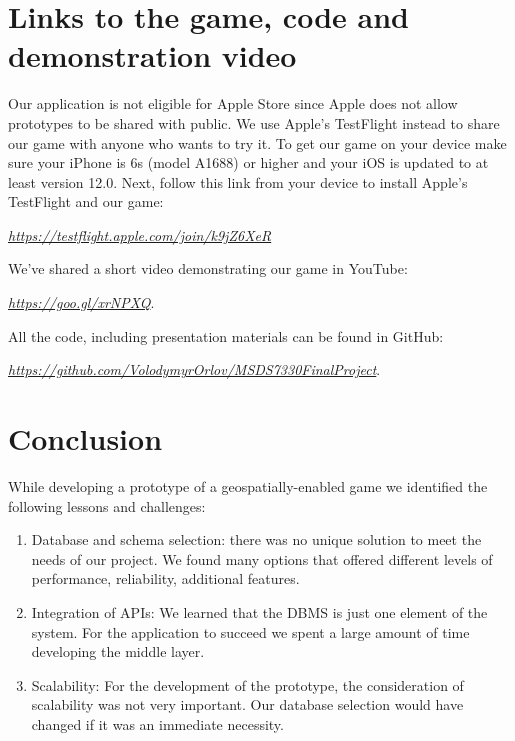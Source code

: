 \documentclass[conference]{IEEEtran}
\begin{document}
\section*{Links to the game, code  and demonstration video}

Our application is not eligible for Apple Store since Apple does not allow prototypes to be shared with public. We use Apple’s TestFlight instead to share our game with anyone who wants to try it. To get our game on your device make sure your iPhone is 6s (model A1688) or higher and your iOS is updated to at least version 12.0.  Next, follow this link from your device to install Apple's TestFlight and our game: 

\begin{center}
\textit{\small{\url{https://testflight.apple.com/join/k9jZ6XeR}}}
\end{center}

We've shared a short video demonstrating our game in YouTube:

\begin{center}
\textit{\small{\url{https://goo.gl/xrNPXQ}}}. 
\end{center}

All the code, including presentation materials can be found in GitHub:

\begin{center}
\textit{\small{\url{https://github.com/VolodymyrOrlov/MSDS7330FinalProject}}}. 
\end{center}

\section{Conclusion}

While developing a prototype of a geospatially-enabled game we identified the following lessons and challenges:

\begin{enumerate}
\item Database and schema selection: there was no unique solution to meet the needs of our project. We found many options that offered different levels of performance, reliability, additional features.
\item Integration of APIs: We learned that the DBMS is just one element of the system. For the application to succeed we spent a large amount of time developing the middle layer.
\item Scalability: For the development of the prototype, the consideration of scalability was not very important. Our database selection would have changed if it was an immediate necessity. 
\end{enumerate}
\end{document}
